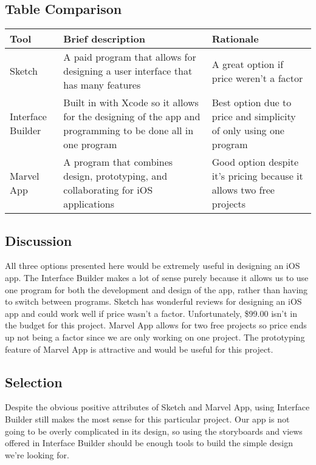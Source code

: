 \documentclass[letterpaper,10pt,draftclsnofoot,onecolumn,titlepage]{IEEEtran}
\begin{document}
	\subsection{Table Comparison}

	\begin{center}
	\begin{tabular} { | m{3cm} | m{5cm} | m{5cm} | }
	\hline\hline
	Tool & Brief description & Rationale \\ [0.5ex]
	\hline
	Sketch & A paid program that allows for designing a user interface that has many features & A great option if price weren't a factor \\
	\hline
	Interface Builder & Built in with Xcode so it allows for the designing of the app and programming to be done all in one program & Best option due to price and simplicity of only using one program \\
	\hline
	Marvel App & A program that combines design, prototyping, and collaborating for iOS applications & Good option despite it's pricing because it allows two free projects \\
	\hline
	\end{tabular}
	\end{center}


	\subsection{Discussion}
	All three options presented here would be extremely useful in designing an iOS app.
	The Interface Builder makes a lot of sense purely because it allows us to use one program for both the development and design of the app, rather than having to switch between programs.
	Sketch has wonderful reviews for designing an iOS app and could work well if price wasn't a factor.
	Unfortunately, \$99.00 isn't in the budget for this project.
	Marvel App allows for two free projects so price ends up not being a factor since we are only working on one project.
	The prototyping feature of Marvel App is attractive and would be useful for this project.

	\subsection{Selection}
	Despite the obvious positive attributes of Sketch and Marvel App, using Interface Builder still makes the most sense for this particular project.
	Our app is not going to be overly complicated in its design, so using the storyboards and views offered in Interface Builder should be enough tools to build the simple design we're looking for.
\end{document}
